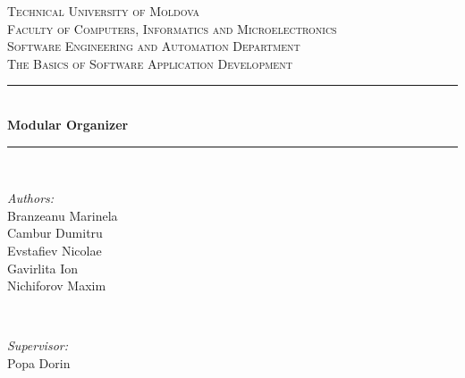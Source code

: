 \begin{titlepage}
	
	
	\newcommand{\HRule}{\rule{\linewidth}{0.5mm}} 

	\begin{center}

	\textsc{\large Technical University of Moldova} \\[0.5cm]
	\textsc{\large Faculty of Computers, Informatics and Microelectronics} \\[0.5cm]
	\textsc{\large Software Engineering and Automation Department} \\[5cm] 
	
	\textsc{\Large The Basics of Software Application Development} \\[0.5cm] 


	\HRule \\[0.5cm]
	\LARGE{\textbf{Modular Organizer}} \\[0.1cm]
	\HRule \\[4cm]

	\begin{minipage}{0.4\textwidth}
		\begin{flushleft} \large
			\emph{Authors:}\\
			Branzeanu Marinela\\
			Cambur Dumitru\\
			Evstafiev Nicolae\\
			Gavirlita Ion\\
			Nichiforov Maxim
		\end{flushleft}
	\end{minipage}
	~
	\begin{minipage}{0.4\textwidth}
		\begin{flushright} \large
			\emph{Supervisor:} \\
			Popa Dorin
		\end{flushright}
	\end{minipage}\\[4cm]


\end{center}
\end{titlepage}

